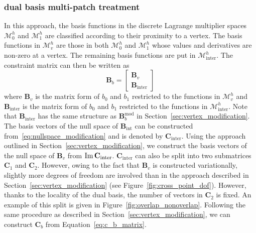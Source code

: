 \subsubsection{\Bezier dual basis multi-patch treatment}\label{sec:original_dual_basis}

In this approach, the basis functions in the discrete Lagrange multiplier spaces $\mathcal{M}^h_0$ and $\mathcal{M}^h_1$ are classified according to their proximity to a vertex. The basis functions in $\mathcal{M}^{h}_v$ are those in both $\mathcal{M}^h_0$ and $\mathcal{M}^h_1$ whose values and derivatives are non-zero at a vertex. The remaining basis functions are put in $\mathcal{M}^{h}_\text{inter}$. The constraint matrix can then be written as
\begin{equation}
  \mathbf{B}_b =
  \begin{bmatrix}
    \mathbf{B}_v \\
    \mathbf{B}_\text{inter}
  \end{bmatrix}
\end{equation}
where $\mathbf{B}_v$ is the matrix form of $b_0$ and $b_1$ restricted to the functions in $\mathcal{M}^{h}_v$ and $\mathbf{B}_\text{inter}$ is the matrix form of $b_0$ and $b_1$ restricted to the functions in $\mathcal{M}^{h}_\text{inter}$. Note that $\mathbf{B}_\text{inter}$ has the same structure as $\mathbf{B}_b^\text{mod}$ in Section~\ref{sec:vertex_modification}. The basis vectors of the null space of $\mathbf{B}_\text{int}$ can be constructed from~\eqref{eq:nullspace_modification} and is denoted by $\mathbf{C}_\text{inter}$. Using the approach outlined in Section~\ref{sec:vertex_modification}, we construct the basis vectors of the null space of $\mathbf{B}_v$ from $\operatorname{Im} \mathbf{C}_\text{inter}$. $\mathbf{C}_\text{inter}$ can also be split into two submatrices $\mathbf{C}_1$ and $\mathbf{C}_2$. However, owing to the fact that $\mathbf{B}_v$ is constructed variationally, slightly more degrees of freedom are involved than in the approach described in Section~\ref{sec:vertex_modification} (see Figure~\ref{fig:cross_point_dof}). However, thanks to the locality of the \Bezier dual basis, the number of vectors in $\mathbf{C}_2$ is fixed. An example of this split is given in Figure~\ref{fig:overlap_nonoverlap}. Following the same procedure as described in Section~\ref{sec:vertex_modification}, we can construct $\mathbf{C}_b$ from Equation~\eqref{eq:c_b_matrix}.

